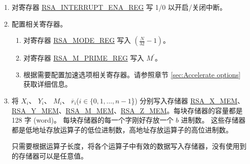 \documentclass[main\_\_CN.tex]{subfiles}
\begin{document}
\begin{enumerate}

    \item 对寄存器 \hyperref[regdesc:RSAINTERRUPTENAREG]{RSA\_INTERRUPT\_ENA\_REG} 写 1/0 以开启/关闭中断。

    \item 配置相关寄存器。

    \begin{enumerate}
        \item 对寄存器 \hyperref[regdesc:RSAMODEXPMODEREG]{RSA\_MODE\_REG} 写入 \begin{math}( \frac{N}{32} - 1 )\end{math}。

        \item 对寄存器 \hyperref[regdesc:RSAMPRIMEREG]{RSA\_M\_PRIME\_REG} 写入 \begin{math}M^{\prime}\end{math}。

        \item 根据需要配置加速选项相关寄存器。请参照章节 \ref{sec:Accelerate options} 获取详细信息。
    \end{enumerate}

    \item 将
        \begin{math}X_{i}\end{math}、
        \begin{math}Y_{i}\end{math}、
        \begin{math}M_{i}\end{math}、
        \begin{math}\overline{r}_{i}\end{math}(\begin{math}i \in \{ 0, 1, \dots, n-1 \end{math}\})
        分别写入存储器 \hyperref[regdesc:RSAmemory]{RSA\_X\_MEM}、\hyperref[regdesc:RSAmemory]{\hyperref[regdesc:RSAmemory]{RSA\_Y\_MEM}}、\hyperref[regdesc:RSAmemory]{RSA\_M\_MEM}、\hyperref[regdesc:RSAmemory]{RSA\_Z\_MEM}。每块存储器的容量都是 128 字 (word)。
        每块存储器的每一个字刚好存放一个 \begin{math}b\end{math} 进制数。
        这些存储器都是低地址存放运算子的低位进制数，高地址存放运算子的高位进制数。

        只需要根据运算子长度，将各个运算子中有效的数据写入存储器，没有使用到的存储器可以是任意值。


\end{enumerate}
\end{document}
